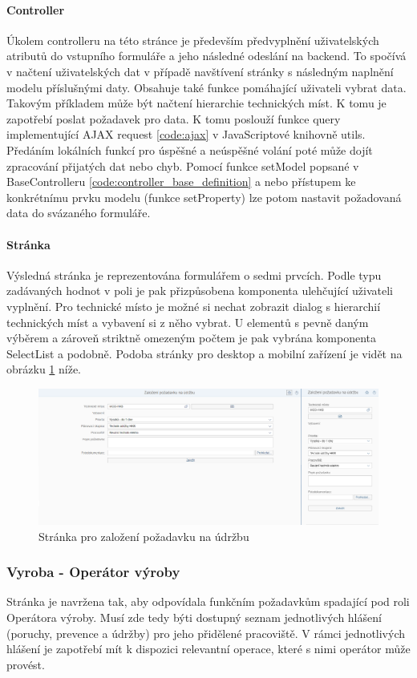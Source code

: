 \documentclass[thesis=M,czech]{FITthesis}[2012/06/26]
\begin{document}
\paragraph{Controller}
Úkolem controlleru na této stránce je především předvyplnění uživatelských atributů do vstupního formuláře a jeho následné odeslání na backend. To spočívá v načtení uživatelských dat v případě navštívení stránky s následným naplnění modelu příslušnými daty. Obsahuje také funkce pomáhající uživateli vybrat data. Takovým příkladem může být načtení hierarchie technických míst. K tomu je zapotřebí poslat požadavek pro data. K tomu poslouží funkce query implementující AJAX request \ref{code:ajax} v JavaScriptové knihovně utils. Předáním lokálních funkcí pro úspěšné a neúspěšné volání poté může dojít zpracování přijatých dat nebo chyb. Pomocí funkce setModel popsané v BaseControlleru \ref{code:controller_base_definition} a nebo přístupem ke konkrétnímu prvku modelu (funkce setProperty) lze potom nastavit požadovaná data do svázaného formuláře. 
\paragraph{Stránka}
Výsledná stránka je reprezentována formulářem o sedmi prvcích. Podle typu zadávaných hodnot v poli je pak přizpůsobena komponenta ulehčující uživateli vyplnění. Pro technické místo je možné si nechat zobrazit dialog s hierarchií technických míst a vybavení si z něho vybrat. U elementů s pevně daným výběrem a zároveň striktně omezeným počtem je pak vybrána komponenta SelectList a podobně. Podoba stránky pro desktop a mobilní zařízení je vidět na obrázku \ref{img:view_zalozeni_pu} níže.
\begin{figure}[H]
	\centering
	\includegraphics[width=1\textwidth]{images/view_zalozeni_pu}
	\caption{Stránka pro založení požadavku na údržbu}
	\label{img:view_zalozeni_pu}
\end{figure}

\subsubsection{Vyroba - Operátor výroby}
\label{sssec:fiori_vyroba}
Stránka je navržena tak, aby odpovídala funkčním požadavkům spadající pod roli Operátora výroby. Musí zde tedy býti dostupný seznam jednotlivých hlášení (poruchy, prevence a údržby) pro jeho přidělené pracoviště. V rámci jednotlivých hlášení je zapotřebí mít k dispozici relevantní operace, které s nimi operátor může provést.
\end{document}
